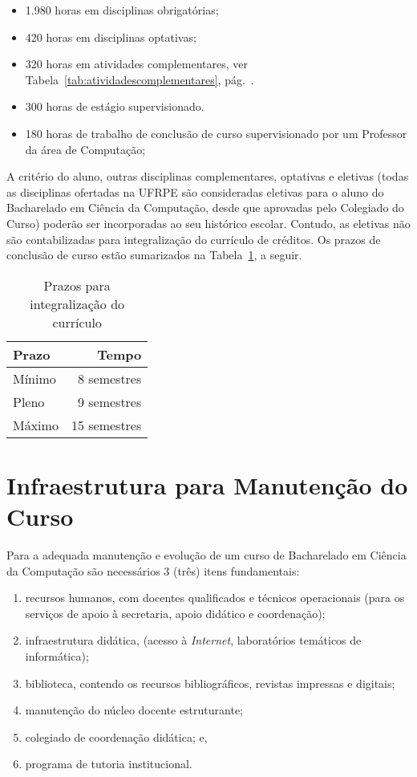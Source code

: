 \documentclass[
	12pt,				%
	openright,			%
  oneside,     %
	a4paper,			%
	english,			%
	french,				%
	spanish,			%
	brazil				%
	]{abntex2}
\begin{document}
\begin{itemize}
  \item 1.980 horas em disciplinas obrigatórias;
  \item 420 horas em disciplinas optativas;
  \item 320 horas em atividades complementares, ver Tabela~\ref{tab:atividadescomplementares}, pág.~\pageref{tab:atividadescomplementares}.
  \item 300 horas de estágio supervisionado.
  \item 180 horas de trabalho de conclusão de curso supervisionado por um Professor da área de Computação;

\end{itemize}

A critério do aluno, outras disciplinas complementares, optativas e eletivas (todas as disciplinas ofertadas na UFRPE são consideradas eletivas para o aluno do Bacharelado em Ciência da Computação, desde que aprovadas pelo Colegiado do Curso) poderão ser incorporadas ao seu histórico escolar. Contudo, as eletivas não são contabilizadas para integralização do currículo de créditos. Os prazos de conclusão de curso estão sumarizados na Tabela~\ref{tab:prazoCurriculo}, a seguir. 

\begin{table}[htbp]
  \centering
  \caption{Prazos para integralização do currículo}
    \begin{tabular}{l|r}
\hline
    \textbf{Prazo} & \textbf{Tempo} \\ \hline 
    Mínimo & 8 semestres \\ \hline
    Pleno & 9 semestres \\ \hline
    Máximo & 15 semestres \\ \hline

    \end{tabular}%
  \label{tab:prazoCurriculo}%
\end{table}%


\section{Infraestrutura para Manutenção do Curso}

Para a adequada manutenção e evolução de um curso de Bacharelado em Ciência da
Computação são necessários 3 (três) itens fundamentais:

\begin{enumerate}
  \item recursos humanos, com docentes qualificados e técnicos operacionais
  (para os serviços de apoio à secretaria, apoio didático e coordenação);
  \item infraestrutura didática, (acesso à \textit{Internet}, laboratórios
  temáticos de informática);
  \item biblioteca, contendo os recursos bibliográficos, revistas impressas e
  digitais;
  \item manutenção do núcleo docente estruturante; 
  \item colegiado de coordenação didática; e,
  \item programa de tutoria institucional.
\end{enumerate} 
\end{document}
